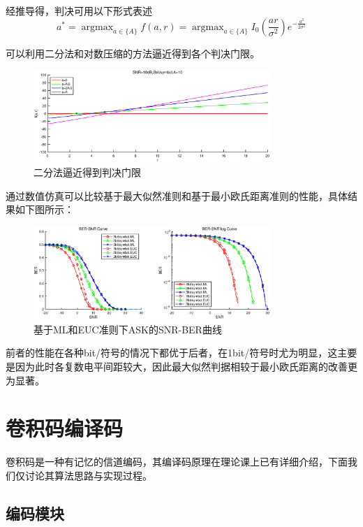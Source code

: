 经推导得，判决可用以下形式表述
\begin{equation*}
    a^*=\mathop{\arg\max}_{a\in\{A\}}f(a,r)=\mathop{\arg\max}_{a\in\{A\}}I_0(\frac{ar}{\sigma^2})e^{-\frac{a^2}{2\sigma^2}}
\end{equation*}

可以利用二分法和对数压缩的方法逼近得到各个判决门限。

\begin{figure}[h]
    \centering
    \includegraphics[width=0.8\textwidth]{pic/threshold.eps}
    \caption{二分法逼近得到判决门限}
\end{figure}

通过数值仿真可以比较基于最大似然准则和基于最小欧氏距离准则的性能，具体结果如下图所示：

\begin{figure}[h]
    \centering
    \includegraphics[width=0.8\textwidth]{pic/ASK_SNR_BER.eps}
    \caption{基于ML和EUC准则下ASK的SNR-BER曲线}
\end{figure}

前者的性能在各种bit/符号的情况下都优于后者，在1bit/符号时尤为明显，这主要是因为此时各复数电平间距较大，因此最大似然判据相较于最小欧氏距离的改善更为显著。

\section{卷积码编译码}

卷积码是一种有记忆的信道编码，其编译码原理在理论课上已有详细介绍，下面我们仅讨论其算法思路与实现过程。

\subsection{编码模块}

